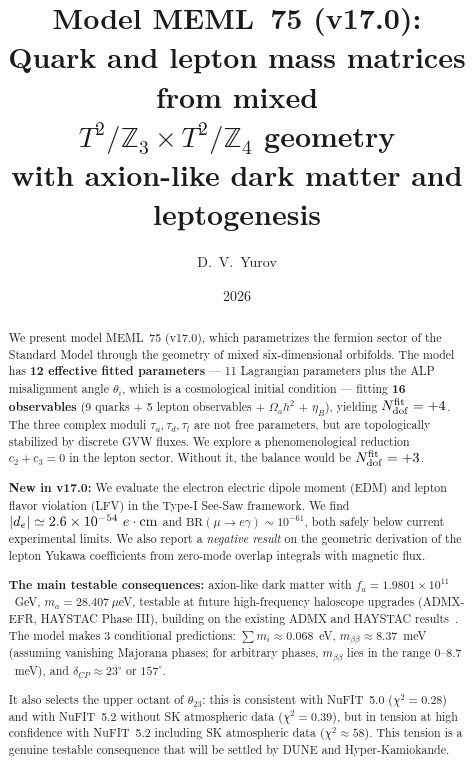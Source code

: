 \documentclass[12pt,a4paper]{article}
\title{\textbf{Model MEML~75 (v17.0):}\\[0.3cm]
\large Quark and lepton mass matrices from mixed \\
\(T^2/\mathbb{Z}_3 \times T^2/\mathbb{Z}_4\) geometry \\
with axion-like dark matter and leptogenesis}
\author{D.~V.~Yurov}
\date{2026}
\numberwithin{equation}{section}
\begin{document}
\maketitle

\begin{abstract}
\noindent
We present model MEML~75 (v17.0), which parametrizes the fermion sector of the Standard Model through the geometry of mixed six-dimensional orbifolds. The model has \textbf{12 effective fitted parameters} --- 11 Lagrangian parameters plus the ALP misalignment angle \(\theta_i\), which is a cosmological initial condition --- fitting \textbf{16 observables} (9 quarks + 5 lepton observables + \(\Omega_a h^2\) + \(\eta_B\)), yielding \(N_{\rm dof}^{\rm fit} = +4\). The three complex moduli \(\tau_u, \tau_d, \tau_l\) are not free parameters, but are topologically stabilized by discrete GVW fluxes. We explore a phenomenological reduction \(c_2 + c_3 = 0\) in the lepton sector. Without it, the balance would be \(N_{\rm dof}^{\rm fit} = +3\).

\textbf{New in v17.0:} We evaluate the electron electric dipole moment (EDM) and lepton flavor violation (LFV) in the Type-I See-Saw framework. We find \(|d_e| \simeq 2.6 \times 10^{-54}~e\cdot{\rm cm}\) and \(\text{BR}(\mu \to e \gamma) \sim 10^{-61}\), both safely below current experimental limits. We also report a \emph{negative result} on the geometric derivation of the lepton Yukawa coefficients from zero-mode overlap integrals with magnetic flux.

\textbf{The main testable consequences:}
axion-like dark matter with \(f_a = 1.9801\times 10^{11}\)~GeV, \(m_a = 28.407~\mu\)eV, testable at future high-frequency haloscope upgrades (ADMX-EFR, HAYSTAC Phase III), building on the existing ADMX and HAYSTAC results~\cite{ADMX2018,HAYSTAC2021}. The model makes 3 conditional predictions: \(\sum m_i \approx 0.068\)~eV, \(m_{\beta\beta} \approx 8.37\)~meV (assuming vanishing Majorana phases; for arbitrary phases, \(m_{\beta\beta}\) lies in the range \(0\)--\(8.7\)~meV), and \(\delta_{CP} \approx 23^\circ\) or \(157^\circ\).

It also selects the upper octant of \(\theta_{23}\): this is consistent with NuFIT~5.0 (\(\chi^2 = 0.28\)) and with NuFIT~5.2 without SK atmospheric data (\(\chi^2 = 0.39\)), but in tension at high confidence with NuFIT~5.2 including SK atmospheric data (\(\chi^2 \approx 58\)). This tension is a genuine testable consequence that will be settled by DUNE and Hyper-Kamiokande.
\end{abstract}
\end{document}
